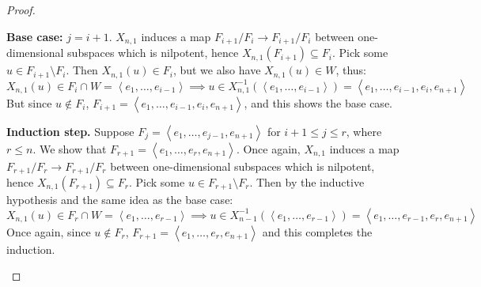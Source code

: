 \documentclass[11pt]{article}
\theoremstyle{definition}
\numberwithin{equation}{section} %
\begin{document}
\begin{proof}
\begin{enumerate}[(a)]
        \smallskip

        \textbf{Base case:} $j=i+1$. $X_{n,1}$ induces a map $F_{i+1}/F_i \to F_{i+1}/F_i$ between one-dimensional subspaces which is nilpotent, hence $X_{n,1} \left(F_{i+1}\right) \subseteq F_i$. Pick some $u\in F_{i+1}\setminus F_i$. Then $X_{n,1}(u) \in F_i$, but we also have $X_{n,1}(u) \in W$, thus:
        $$
        X_{n,1}(u) \in F_i\cap W = \left\langle e_1, \ldots, e_{i-1}\right\rangle \implies u \in X_{n,1}^{-1}\left(\left\langle e_1, \ldots, e_{i-1}\right\rangle \right) = \left\langle e_1, \ldots, e_{i-1}, e_i, e_{n+1}\right\rangle
        $$
        But since $u\notin F_i$, $F_{i+1} = \left\langle e_1, \ldots, e_{i-1}, e_i, e_{n+1}\right\rangle$, and this shows the base case.

        \smallskip 

        \textbf{Induction step.} Suppose $F_j = \left\langle e_1, \ldots, e_{j-1}, e_{n+1}\right\rangle$ for $i+1\leq  j\leq r$, where $r\leq n$. We show that $F_{r+1} = \left\langle e_1, \ldots, e_{r}, e_{n+1}\right\rangle$. Once again, $X_{n,1}$ induces a map $F_{r+1}/F_r \to F_{r+1}/F_r$ between one-dimensional subspaces which is nilpotent, hence $X_{n,1} \left(F_{r+1}\right)\subseteq F_r$. Pick some $u\in F_{r+1}\setminus F_r$. Then by the inductive hypothesis and the same idea as the base case:
        $$
        X_{n,1}(u) \in F_r \cap W = \left\langle e_1, \ldots, e_{r-1}\right\rangle \implies u \in X_{n-1}^{-1} \left(\left\langle e_1, \ldots, e_{r-1}\right\rangle\right) = \left\langle e_1, \ldots, e_{r-1}, e_r, e_{n+1}\right\rangle
        $$
        Once again, since $u\notin F_r$, $F_{r+1} =  \left\langle e_1, \ldots, e_{r}, e_{n+1}\right\rangle$ and this completes the induction.

        \smallskip


\end{enumerate}
\end{proof}
\end{document}
